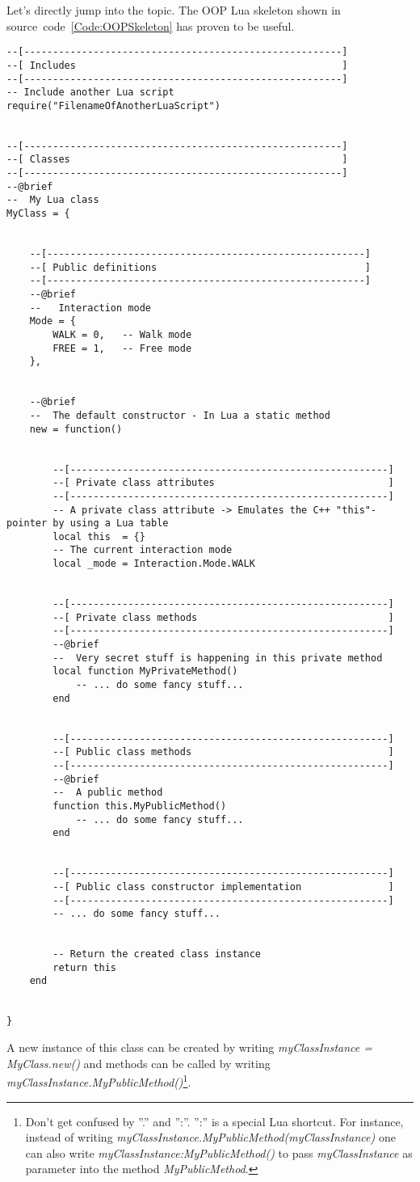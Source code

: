 Let's directly jump into the topic. The OOP Lua skeleton shown in source~code~\ref{Code:OOPSkeleton} has proven to be useful.
\begin{lstlisting}[label=Code:OOPSkeleton,caption={Object-oriented programming (OOP) Lua skeleton}]
--[-------------------------------------------------------]
--[ Includes                                              ]
--[-------------------------------------------------------]
-- Include another Lua script
require("FilenameOfAnotherLuaScript")


--[-------------------------------------------------------]
--[ Classes                                               ]
--[-------------------------------------------------------]
--@brief
--  My Lua class
MyClass = {


	--[-------------------------------------------------------]
	--[ Public definitions                                    ]
	--[-------------------------------------------------------]
	--@brief
	--   Interaction mode
	Mode = {
		WALK = 0,	-- Walk mode
		FREE = 1,	-- Free mode
	},


	--@brief
	--  The default constructor - In Lua a static method
	new = function()


		--[-------------------------------------------------------]
		--[ Private class attributes                              ]
		--[-------------------------------------------------------]
		-- A private class attribute -> Emulates the C++ "this"-pointer by using a Lua table
		local this	= {}
		-- The current interaction mode
		local _mode	= Interaction.Mode.WALK


		--[-------------------------------------------------------]
		--[ Private class methods                                 ]
		--[-------------------------------------------------------]
		--@brief
		--  Very secret stuff is happening in this private method
		local function MyPrivateMethod()
			-- ... do some fancy stuff...
		end


		--[-------------------------------------------------------]
		--[ Public class methods                                  ]
		--[-------------------------------------------------------]
		--@brief
		--  A public method
		function this.MyPublicMethod()
			-- ... do some fancy stuff...
		end


		--[-------------------------------------------------------]
		--[ Public class constructor implementation               ]
		--[-------------------------------------------------------]
		-- ... do some fancy stuff...


		-- Return the created class instance
		return this
	end


}
\end{lstlisting}
A new instance of this class can be created by writing \emph{myClassInstance = MyClass.new()} and methods can be called by writing \emph{myClassInstance.MyPublicMethod()}\footnote{Don't get confused by ''.'' and '':''. '':'' is a special Lua shortcut. For instance, instead of writing \emph{myClassInstance.MyPublicMethod(myClassInstance)} one can also write \emph{myClassInstance:MyPublicMethod()} to pass \emph{myClassInstance} as parameter into the method \emph{MyPublicMethod}.}.

